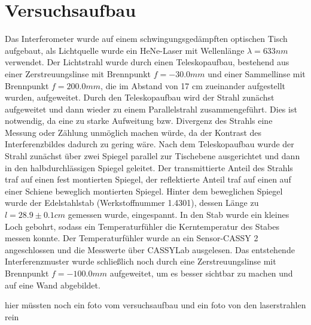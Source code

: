 \section{Versuchsaufbau}

Das Interferometer wurde auf einem schwingungsgedämpften optischen Tisch aufgebaut, als Lichtquelle wurde ein HeNe-Laser mit Wellenlänge $\lambda=633 nm$ verwendet. Der Lichtstrahl wurde durch einen Teleskopaufbau, bestehend aus einer Zerstreuungslinse mit Brennpunkt $f=-30.0 mm$ und einer Sammellinse mit Brennpunkt $f=200.0 mm$, die im Abstand von 17 cm zueinander aufgestellt wurden, aufgeweitet. Durch den Teleskopaufbau wird der Strahl zunächst aufgeweitet und dann wieder zu einem Parallelstrahl zusammengeführt. Dies ist notwendig, da eine zu starke Aufweitung bzw. Divergenz des Strahls eine Messung oder Zählung unmöglich machen würde, da der Kontrast des Interferenzbildes dadurch zu gering wäre. Nach dem Teleskopaufbau wurde der Strahl zunächst über zwei Spiegel parallel zur Tischebene ausgerichtet und dann in den halbdurchlässigen Spiegel geleitet. Der transmittierte Anteil des Strahls traf auf einen fest montierten Spiegel, der reflektierte Anteil traf auf einen auf einer Schiene beweglich montierten Spiegel. Hinter dem beweglichen Spiegel wurde der Edelstahlstab (Werkstoffnummer 1.4301), dessen Länge zu $l=28.9\pm0.1 cm$ gemessen wurde, eingespannt. In den Stab wurde ein kleines Loch gebohrt, sodass ein Temperaturfühler die Kerntemperatur des Stabes messen konnte. Der Temperaturfühler wurde an ein Sensor-CASSY 2 angeschlossen und die Messwerte über CASSYLab ausgelesen. Das entstehende Interferenzmuster wurde schließlich noch durch eine Zerstreuungslinse mit Brennpunkt $f=-100.0 mm$ aufgeweitet, um es besser sichtbar zu machen und auf eine Wand abgebildet.

hier müssten noch ein foto vom versuchsaufbau und ein foto von den laserstrahlen rein

